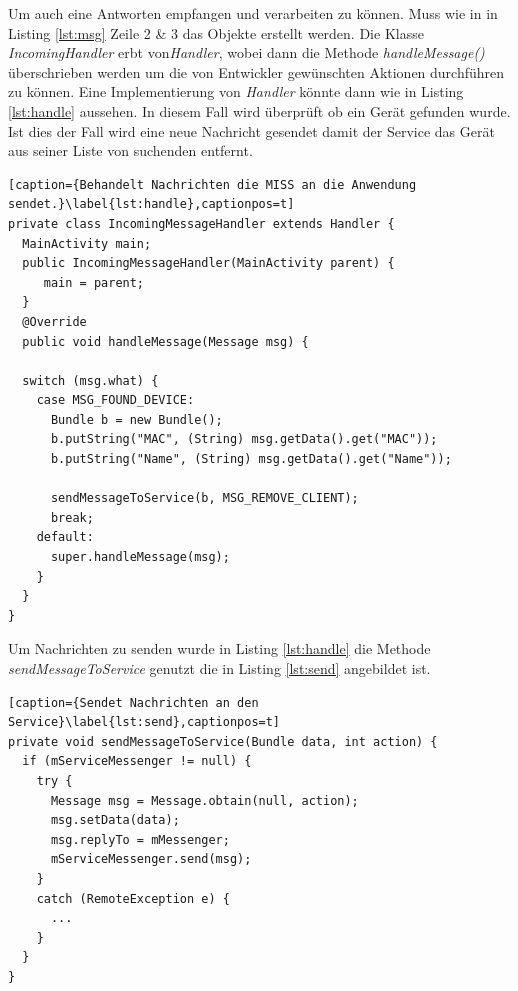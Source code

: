\documentclass[]{report}
\begin{document}
 Um auch eine Antworten empfangen und verarbeiten zu können. Muss wie in in Listing \ref{lst:msg} Zeile 2 \& 3 das Objekte erstellt werden. Die Klasse \textit{IncomingHandler} erbt von\textit{Handler}, wobei dann die Methode \textit{handleMessage()} überschrieben werden um die von Entwickler gewünschten Aktionen durchführen zu können. Eine Implementierung von \textit{Handler} könnte dann wie in Listing \ref{lst:handle} aussehen. In diesem Fall wird überprüft ob ein Gerät gefunden wurde. Ist dies der Fall wird eine neue Nachricht gesendet damit der Service das Gerät aus seiner Liste von suchenden entfernt. 
\begin{lstlisting}[caption={Behandelt Nachrichten die MISS an die Anwendung sendet.}\label{lst:handle},captionpos=t] 
private class IncomingMessageHandler extends Handler {
  MainActivity main;
  public IncomingMessageHandler(MainActivity parent) {
     main = parent;
  }
  @Override
  public void handleMessage(Message msg) {
  
  switch (msg.what) {
    case MSG_FOUND_DEVICE:
	  Bundle b = new Bundle();
	  b.putString("MAC", (String) msg.getData().get("MAC"));
	  b.putString("Name", (String) msg.getData().get("Name"));
	  
	  sendMessageToService(b, MSG_REMOVE_CLIENT);
      break;
    default:
      super.handleMessage(msg);
    }
  }
}
\end{lstlisting}
Um Nachrichten zu senden wurde in Listing \ref{lst:handle} die Methode \textit{sendMessageToService} genutzt die in Listing \ref{lst:send} angebildet ist. 
\begin{lstlisting}[caption={Sendet Nachrichten an den Service}\label{lst:send},captionpos=t] 
private void sendMessageToService(Bundle data, int action) {
  if (mServiceMessenger != null) {
    try {
      Message msg = Message.obtain(null, action);
      msg.setData(data);
      msg.replyTo = mMessenger;
      mServiceMessenger.send(msg);
    } 
    catch (RemoteException e) {
      ...
    }
  }
}
\end{lstlisting}
\end{document}
